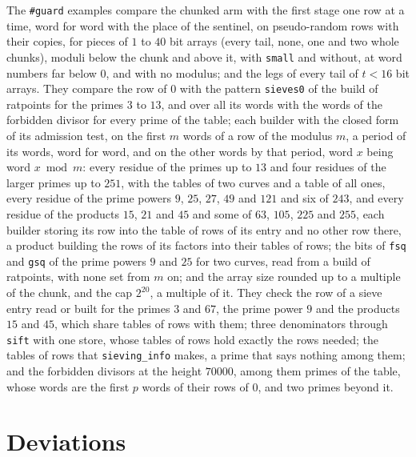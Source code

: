 The \verb|#guard| examples compare the chunked arm with the first stage one row at a time, word for
word with the place of the sentinel, on pseudo-random rows with their copies, for pieces of $1$ to
$40$ bit arrays (every tail, none, one and two whole chunks), moduli below the chunk and above it,
with \verb|small| and without, at word numbers far below $0$, and with no modulus; and the legs of
every tail of $t < 16$ bit arrays. They compare the row of $0$ with the pattern \verb|sieves0| of
the build of ratpoints for the primes $3$ to $13$, and over all its words with the words of the
forbidden divisor for every prime of the table; each builder with the closed form of its admission
test, on the first $m$ words of a row of the modulus $m$, a period of its words, word for word, and
on the other words by that period, word $x$ being word $x \bmod m$: every residue of the primes up
to $13$ and four residues of the larger primes up to $251$, with the tables of two curves and a
table of all ones, every residue of the prime powers $9$, $25$, $27$, $49$ and $121$ and six of
$243$, and every residue of the products $15$, $21$ and $45$ and some of $63$, $105$, $225$ and
$255$, each builder storing its row into the table of rows of its entry and no other row there, a
product building the rows of its factors into their tables of rows; the bits of \verb|fsq| and
\verb|gsq| of the prime powers $9$ and $25$ for two curves, read from a build of ratpoints, with
none set from $m$ on; and the array size rounded up to a multiple of the chunk, and the cap
$2^{20}$, a multiple of it. They check the row of a sieve entry read or built for the primes $3$ and
$67$, the prime power $9$ and the products $15$ and $45$, which share tables of rows with them;
three denominators through \verb|sift| with one store, whose tables of rows hold exactly the rows
needed; the tables of rows that \verb|sieving_info| makes, a prime that says nothing among them; and
the forbidden divisors at the height $70000$, among them primes of the table, whose words are the
first $p$ words of their rows of $0$, and two primes beyond it.

\section{Deviations}\label{sec:rowsDeviations}

